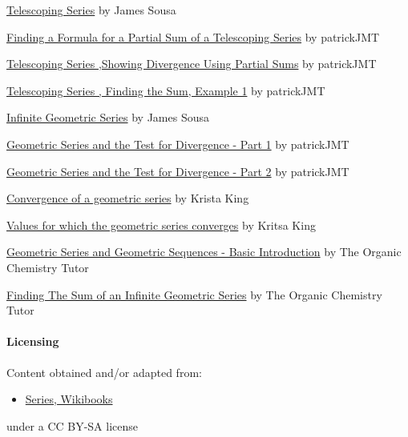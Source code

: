 \href{https://youtu.be/6LfoMmCckFY}{Telescoping Series} by James Sousa



\href{https://youtu.be/cyoiIBs7kIg}{Finding a Formula for a Partial Sum of a Telescoping Series} by patrickJMT



\href{https://youtu.be/xmyLUFv2mDM}{Telescoping Series ,Showing Divergence Using Partial Sums} by patrickJMT



\href{https://youtu.be/H8HVYiEqzBo}{Telescoping Series , Finding the Sum, Example 1} by patrickJMT



\href{https://youtu.be/pFcJZnxqzNc}{Infinite Geometric Series} by James Sousa



\href{https://youtu.be/xjmy5hkZccY}{Geometric Series and the Test for Divergence - Part 1} by patrickJMT



\href{https://youtu.be/C8piSCOdo1Y}{Geometric Series and the Test for Divergence - Part 2} by patrickJMT



\href{https://youtu.be/LhO7i3RFri0}{Convergence of a geometric series} by Krista King



\href{https://youtu.be/1eInMsp20cI}{Values for which the geometric series converges} by Kritsa King



\href{https://youtu.be/-5kIBPR2Npk}{Geometric Series and Geometric Sequences - Basic Introduction} by The Organic Chemistry Tutor



\href{https://youtu.be/jxRqRLMliPc}{Finding The Sum of an Infinite Geometric Series} by The Organic Chemistry Tutor



\paragraph{Licensing}



Content obtained and/or adapted from:



\begin{itemize}
    \item \href{https://en.wikibooks.org/wiki/User:Dcljr/Series}{Series, Wikibooks}
\end{itemize}
    under a CC BY-SA license

